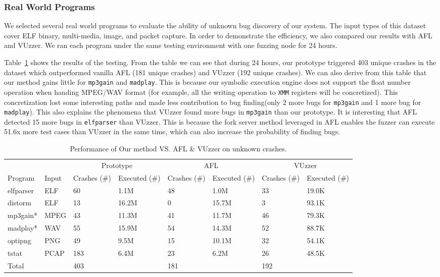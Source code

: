 \subsubsection{Real World Programs}
We selected several real world programs to evaluate the ability of unknown bug discovery of our system. The input types of this dataset cover ELF binary, multi-media, image, and packet capture. In order to demonstrate the efficiency, we also compared our results with AFL and VUzzer. We ran each program under the same testing environment with one fuzzing node for 24 hours. 

Table~\ref{zero-days} shows the results of the testing. 
From the table we can see that during 24 hours, our prototype triggered 403 unique crashes in the dataset which outperformed vanilla AFL (181 unique crashes) and VUzzer (192 unique crashes). 
We can also derive from this table that our method gains little for \texttt{mp3gain} and \texttt{madplay}. This is because our symbolic execution engine does not support the float number operation when handing MPEG/WAV format (for example, all the writing operation to \texttt{XMM} registers will be concretized). This concretization lost some interesting paths and made less contribution to bug finding(only 2 more bugs for \texttt{mp3gain} and 1 more bug for \texttt{madplay}). 
This also explains the phenomena that VUzzer found more bugs in \texttt{mp3gain} than our prototype. 
It is interesting that AFL detected 15 more bugs in \texttt{elfparser} than VUzzer. This is because the fork server method leveraged in AFL enables the fuzzer can execute 51.6x more test cases than VUzzer in the same time, which can also increase the probability of finding bugs.

\begin{table}
  \caption{\label{zero-days}Performance of Our method VS. AFL \& VUzzer on unknown crashes.}
  \centering
	\begin{tabular}{l p{1.5cm}<{\centering} p{1.5cm}<{\centering} p{1.5cm}<{\centering} p{1.5cm}<{\centering} p{1.5cm}<{\centering} p{1.5cm}<{\centering} p{1.5cm}<{\centering}}
		\toprule
		& & \multicolumn{2}{c}{Prototype} & \multicolumn{2}{c}{AFL} & \multicolumn{2}{c}{VUzzer}\\
	    Program & Input & Crashes (\#) & Executed (\#)& Crashes (\#) & Executed (\#) & Crashes (\#) & Executed (\#)\\
		\midrule
		elfparser  & ELF	& 60 &   1.1M & 48   & 1.0M   & 33 & 19.0K    \\
		distorm    & ELF    & 13 &   16.2M   & 0   & 15.7M    & 3 & 93.1K    \\
		mp3gain*   & MPEG	& 43 &   11.3M  & 41  &  11.7M   & 46 &  79.3K  \\
		madplay*   & WAV	& 55 &   15.9M  & 54  & 14.3M    & 52 & 88.7K   \\
		optipng    & PNG    & 49 &   9.5M & 15  &  10.1M   & 32 & 54.1K   \\
		tstat      & PCAP   & 183&   6.4M & 23 &  6.2M   & 26 & 48.5K   \\
		\hline
		Total      &        & 403   &  & 181 &  & 192 &\\
	 \bottomrule
	\end{tabular}
\end{table}
